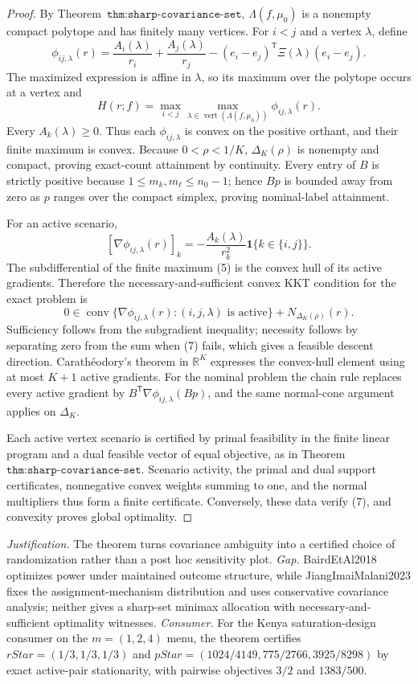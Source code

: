 \documentclass{article}
\begin{document}
\begin{proof}
By Theorem~\(\texttt{thm:sharp-covariance-set}\), \(\Lambda(f,\mu_0)\) is a nonempty compact polytope and has finitely many vertices. For \(i<j\) and a vertex \(\lambda\), define
\[
\phi_{ij,\lambda}(r)=\frac{A_i(\lambda)}{r_i}+\frac{A_j(\lambda)}{r_j}-(e_i-e_j)^{\mathsf T}\Xi(\lambda)(e_i-e_j).
\]
The maximized expression is affine in \(\lambda\), so its maximum over the polytope occurs at a vertex and
\[
H(r;f)=\max_{i<j}\max_{\lambda\in\operatorname{vert}(\Lambda(f,\mu_0))}\phi_{ij,\lambda}(r).
\tag{5}
\]
Every \(A_k(\lambda)\ge0\). Thus each \(\phi_{ij,\lambda}\) is convex on the positive orthant, and their finite maximum is convex. Because \(0<\rho<1/K\), \(\Delta_K(\rho)\) is nonempty and compact, proving exact-count attainment by continuity. Every entry of \(B\) is strictly positive because \(1\le m_k,m_\ell\le n_0-1\); hence \(Bp\) is bounded away from zero as \(p\) ranges over the compact simplex, proving nominal-label attainment.

For an active scenario,
\[
[\nabla\phi_{ij,\lambda}(r)]_k=-\frac{A_k(\lambda)}{r_k^2}\mathbf1\{k\in\{i,j\}\}.
\tag{6}
\]
The subdifferential of the finite maximum (5) is the convex hull of its active gradients. Therefore the necessary-and-sufficient convex KKT condition for the exact problem is
\[
0\in\operatorname{conv}\{\nabla\phi_{ij,\lambda}(r):(i,j,\lambda)\text{ is active}\}+N_{\Delta_K(\rho)}(r).
\tag{7}
\]
Sufficiency follows from the subgradient inequality; necessity follows by separating zero from the sum when (7) fails, which gives a feasible descent direction. Carath\'eodory's theorem in \(\mathbb R^K\) expresses the convex-hull element using at most \(K+1\) active gradients. For the nominal problem the chain rule replaces every active gradient by \(B^{\mathsf T}\nabla\phi_{ij,\lambda}(Bp)\), and the same normal-cone argument applies on \(\Delta_K\).

Each active vertex scenario is certified by primal feasibility in the finite linear program and a dual feasible vector of equal objective, as in Theorem~\(\texttt{thm:sharp-covariance-set}\). Scenario activity, the primal and dual support certificates, nonnegative convex weights summing to one, and the normal multipliers thus form a finite certificate. Conversely, these data verify (7), and convexity proves global optimality.
\end{proof}
\par\smallskip\noindent \textit{Justification.} The theorem turns covariance ambiguity into a certified choice of randomization rather than a post hoc sensitivity plot. \textit{Gap.} BairdEtAl2018 optimizes power under maintained outcome structure, while JiangImaiMalani2023 fixes the assignment-mechanism distribution and uses conservative covariance analysis; neither gives a sharp-set minimax allocation with necessary-and-sufficient optimality witnesses. \textit{Consumer.} For the Kenya saturation-design consumer on the \(m=(1,2,4)\) menu, the theorem certifies \(rStar=(1/3,1/3,1/3)\) and \(pStar=(1024/4149,775/2766,3925/8298)\) by exact active-pair stationarity, with pairwise objectives \(3/2\) and \(1383/500\).
\end{document}
